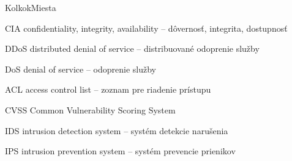 \begin{seznamzkratek}{KolkokMiesta}

		{CIA} %
		{confidentiality, integrity, availability -- dôvernosť, integrita, dostupnosť} %

		{DDoS} %
		{distributed denial of service -- distribuované odoprenie služby} %
	
	{DoS} %
	{denial of service -- odoprenie služby} %

		{ACL} %
		{access control list -- zoznam pre riadenie prístupu} %

		{CVSS} %
		{Common Vulnerability Scoring System} %
		
		{IDS} %
		{intrusion detection system -- systém detekcie narušenia} %

		{IPS} %
		{intrusion prevention system -- systém prevencie prienikov} %

\end{seznamzkratek}
